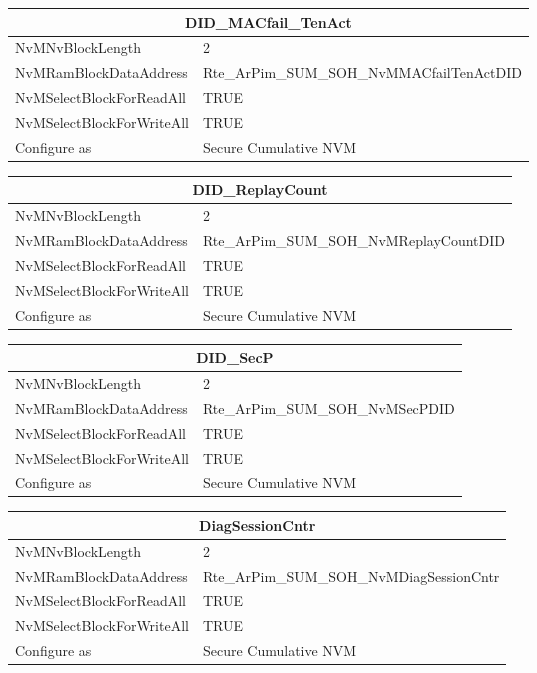 \begin{tabular}{|l|p{8cm}|}\hline
\multicolumn{2}{|c|}{\textbf{DID\_MACfail\_TenAct}}\\\hline
NvMNvBlockLength&2\\\hline
NvMRamBlockDataAddress&Rte\_ArPim\_SUM\_SOH\_NvMMACfailTenActDID\\\hline
NvMSelectBlockForReadAll&TRUE\\\hline
NvMSelectBlockForWriteAll&TRUE\\\hline
Configure as&Secure Cumulative NVM\\\hline
\end{tabular}

\begin{tabular}{|l|p{8cm}|}\hline
\multicolumn{2}{|c|}{\textbf{DID\_ReplayCount}}\\\hline
NvMNvBlockLength&2\\\hline
NvMRamBlockDataAddress&Rte\_ArPim\_SUM\_SOH\_NvMReplayCountDID\\\hline
NvMSelectBlockForReadAll&TRUE\\\hline
NvMSelectBlockForWriteAll&TRUE\\\hline
Configure as&Secure Cumulative NVM\\\hline
\end{tabular}

\begin{tabular}{|l|p{8cm}|}\hline
\multicolumn{2}{|c|}{\textbf{DID\_SecP}}\\\hline
NvMNvBlockLength&2\\\hline
NvMRamBlockDataAddress&Rte\_ArPim\_SUM\_SOH\_NvMSecPDID\\\hline
NvMSelectBlockForReadAll&TRUE\\\hline
NvMSelectBlockForWriteAll&TRUE\\\hline
Configure as&Secure Cumulative NVM\\\hline
\end{tabular}

\begin{tabular}{|l|p{8cm}|}\hline
\multicolumn{2}{|c|}{\textbf{DiagSessionCntr}}\\\hline
NvMNvBlockLength&2\\\hline
NvMRamBlockDataAddress&Rte\_ArPim\_SUM\_SOH\_NvMDiagSessionCntr\\\hline
NvMSelectBlockForReadAll&TRUE\\\hline
NvMSelectBlockForWriteAll&TRUE\\\hline
Configure as&Secure Cumulative NVM\\\hline
\end{tabular}

